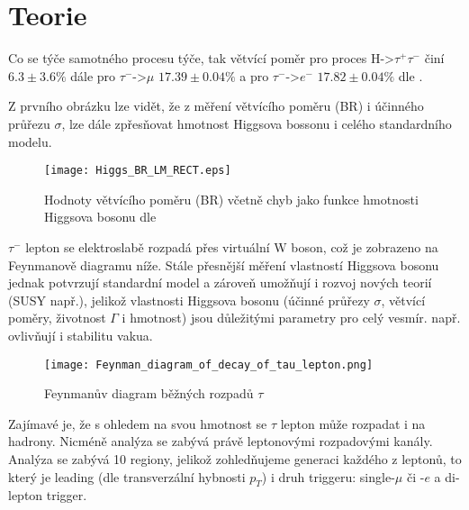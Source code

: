 \documentclass{article}
\begin{document}
\section*{Teorie}
\par Co se týče samotného procesu týče, tak větvící poměr pro proces H->$\tau^{+}\tau^{-}$ činí $6.3\pm3.6 \%$ dále pro $\tau^{-}$->$\mu$ $17.39\pm0.04 \%$ a pro $\tau^{-}$->$e^{-}$ $17.82\pm0.04 \%$ dle \cite{PDG}.
\par Z prvního obrázku lze vidět, že z měření větvícího poměru (BR) i účinného průřezu $\sigma$, lze dále zpřesňovat hmotnost Higgsova bossonu i celého standardního modelu.
\begin{figure}[H]
\centering
\texttt{[image: Higgs\_BR\_LM\_RECT.eps]}
\caption{Hodnoty větvícího poměru (BR) včetně chyb jako funkce hmotnosti Higgsova bosonu dle \cite{HiggsBR}}
\end{figure}
\par $\tau^{-}$ lepton se elektroslabě rozpadá přes virtuální W boson, což je zobrazeno na Feynmanově diagramu níže. Stále přesnější měření vlastností Higgsova bosonu jednak potvrzují standardní model a zároveň umožňují i rozvoj nových teorií (SUSY např.), jelikož vlastnosti Higgsova bosonu (účinné průřezy $\sigma$, větvící poměry, životnost $\Gamma$ i hmotnost) jsou důležitými parametry pro celý vesmír. např. ovlivňují i stabilitu vakua.
\begin{figure}[H]
\centering
\texttt{[image: Feynman\_diagram\_of\_decay\_of\_tau\_lepton.png]}
\caption{Feynmanův diagram běžných rozpadů $\tau$ \cite{TauWiki}}
\end{figure}
\par Zajímavé je, že s ohledem na svou hmotnost se $\tau$ lepton může rozpadat i na hadrony. Nicméně analýza se zabývá právě leptonovými rozpadovými kanály. Analýza se zabývá 10 regiony, jelikož zohledňujeme generaci každého z leptonů, to který je leading (dle transverzální hybnosti $p_{T}$) i druh triggeru: single-$\mu$ či -$e$ a di-lepton trigger.
\end{document}
